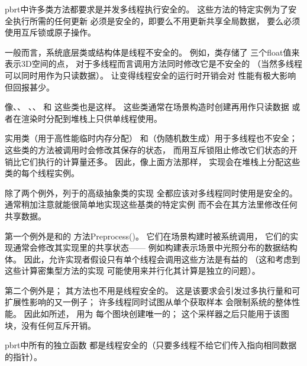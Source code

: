 pbrt中许多类方法都要求是并发多线程执行安全的。
这些方法的特定实例为了安全执行所需的任何更新
必须是安全的，即要么不用更新共享全局数据，
要么必须使用互斥锁或原子操作。

一般而言，系统底层类或结构体是线程不安全的。
例如，类存储了
三个{\ttfamily float}值来表示3D空间的点，
对于多线程而言调用方法同时修改它是不安全的
（当然多线程可以同时用作为只读数据）。
让变得线程安全的运行时开销会对
性能有极大影响但回报甚少。

像、、
、、
和
这些类也是这样。
这些类通常在场景构造时创建再用作只读数据
或者在渲染时分配到堆栈上只供单线程使用。

实用类（用于高性能临时内存分配）
和（伪随机数生成）用于多线程也不安全；
这些类的方法被调用时会修改其保存的状态，
而用互斥锁阻止修改它们状态的开销比它们执行的计算量还多。
因此，像上面方法那样，
实现会在堆栈上分配这些类的每个线程实例。

除了两个例外，列于的高级抽象类的实现
全都应该对多线程同时使用是安全的。
通常稍加注意就能很简单地实现这些基类的特定实例
而不会在其方法里修改任何共享数据。

第一个例外是和的
方法{\ttfamily Preprocess()}。
它们在场景构建时被系统调用，
它们的实现通常会修改其实现里的共享状态——
例如构建表示场景中光照分布的数据结构体。
因此，允许实现者假设只有单个线程会调用这些方法是有益的
（这和考虑到这些计算密集型方法的实现
可能使用来并行化其计算是独立的问题）。

第二个例外是；
其方法也不用是线程安全的。
这是该要求会引发过多执行量和可扩展性影响的又一例子；
许多线程同时试图从单个获取样本
会限制系统的整体性能。
因此如所述，
用为
每个图块创建唯一的；
这个采样器之后只能用于该图块，没有任何互斥开销。

pbrt中所有的独立函数
都是线程安全的（只要多线程不给它们传入指向相同数据的指针）。